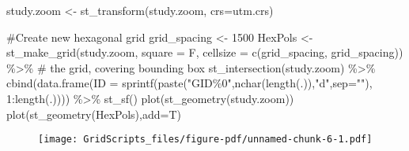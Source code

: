 \documentclass[
  letterpaper,
]{book}
\newenvironment{Shaded}{\begin{snugshade}}{\end{snugshade}}
\newcommand{\AttributeTok}[1]{\textcolor[rgb]{0.40,0.45,0.13}{#1}}
\newcommand{\CommentTok}[1]{\textcolor[rgb]{0.37,0.37,0.37}{#1}}
\newcommand{\DecValTok}[1]{\textcolor[rgb]{0.68,0.00,0.00}{#1}}
\newcommand{\FunctionTok}[1]{\textcolor[rgb]{0.28,0.35,0.67}{#1}}
\newcommand{\NormalTok}[1]{\textcolor[rgb]{0.00,0.23,0.31}{#1}}
\newcommand{\OtherTok}[1]{\textcolor[rgb]{0.00,0.23,0.31}{#1}}
\newcommand{\SpecialCharTok}[1]{\textcolor[rgb]{0.37,0.37,0.37}{#1}}
\newcommand{\StringTok}[1]{\textcolor[rgb]{0.13,0.47,0.30}{#1}}
\begin{document}
\begin{Shaded}
\begin{Highlighting}[]
\NormalTok{study.zoom }\OtherTok{\textless{}{-}} \FunctionTok{st\_transform}\NormalTok{(study.zoom, }\AttributeTok{crs=}\NormalTok{utm.crs)}

\CommentTok{\#Create new hexagonal grid}
\NormalTok{grid\_spacing }\OtherTok{\textless{}{-}} \DecValTok{1500}
\NormalTok{HexPols }\OtherTok{\textless{}{-}} \FunctionTok{st\_make\_grid}\NormalTok{(study.zoom, }\AttributeTok{square =}\NormalTok{ F, }\AttributeTok{cellsize =} \FunctionTok{c}\NormalTok{(grid\_spacing, grid\_spacing)) }\SpecialCharTok{\%\textgreater{}\%} \CommentTok{\# the grid, covering bounding box}
  \FunctionTok{st\_intersection}\NormalTok{(study.zoom) }\SpecialCharTok{\%\textgreater{}\%}
    \FunctionTok{cbind}\NormalTok{(}\FunctionTok{data.frame}\NormalTok{(}\AttributeTok{ID =} \FunctionTok{sprintf}\NormalTok{(}\FunctionTok{paste}\NormalTok{(}\StringTok{"GID\%0"}\NormalTok{,}\FunctionTok{nchar}\NormalTok{(}\FunctionTok{length}\NormalTok{(.)),}\StringTok{"d"}\NormalTok{,}\AttributeTok{sep=}\StringTok{""}\NormalTok{), }\DecValTok{1}\SpecialCharTok{:}\FunctionTok{length}\NormalTok{(.)))) }\SpecialCharTok{\%\textgreater{}\%}
    \FunctionTok{st\_sf}\NormalTok{()}
\FunctionTok{plot}\NormalTok{(}\FunctionTok{st\_geometry}\NormalTok{(study.zoom))}
\FunctionTok{plot}\NormalTok{(}\FunctionTok{st\_geometry}\NormalTok{(HexPols),}\AttributeTok{add=}\NormalTok{T)}
\end{Highlighting}
\end{Shaded}

\begin{figure}[H]

{\centering \texttt{[image: GridScripts\_files/figure-pdf/unnamed-chunk-6-1.pdf]}

}

\end{figure}

\begin{Shaded}
\end{Shaded}
\end{document}
